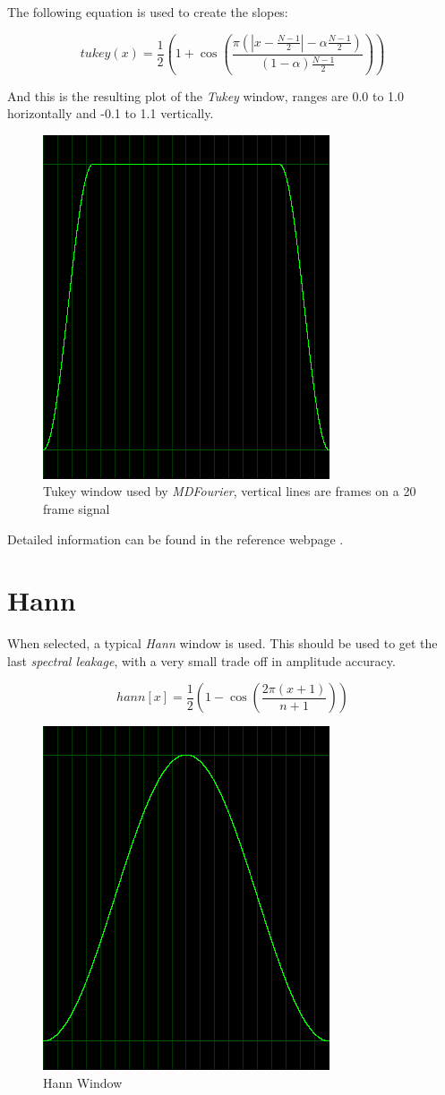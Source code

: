 \documentclass[10pt,a4paper]{report}
\begin{document}
\begin{appendices}
The following equation is used to create the slopes:

\begin{equation}
tukey(x)=\frac{1}{2}(1+\cos(\frac{\pi(|x-\frac{N-1}{2}|-\alpha \frac{N-1}{2})}{(1-\alpha)\frac{N-1}{2}}))
\end{equation}

And this is the resulting plot of the \textit{Tukey} window, ranges are 0.0 to 1.0 horizontally and -0.1 to 1.1 vertically.

\begin{figure}[H]
	\centering
	\includegraphics[width=0.4\linewidth]{images/windows/window-tukey.png}
	\caption[Tukey Window]{Tukey window used by \textit{MDFourier}, vertical lines are frames on a 20 frame signal}
	\label{fig:window-tukey}
\end{figure}

Detailed information can be found in the reference webpage \cite{tukey}.

\section{Hann}
When selected, a typical \textit{Hann} window is used. This should be used to get the last \textit{spectral leakage}, with a very small trade off in amplitude accuracy.

\begin{equation}
hann[x] = \frac{1}{2}(1 - \cos(\frac{2\pi(x+1)}{n+1}))
\end{equation}

\begin{figure}[H]
	\centering
	\includegraphics[width=0.4\linewidth]{images/windows/window-hann.png}
	\caption[Hann Window]{Hann Window}
	\label{fig:window-hann}
\end{figure}


\end{appendices}
\end{document}
